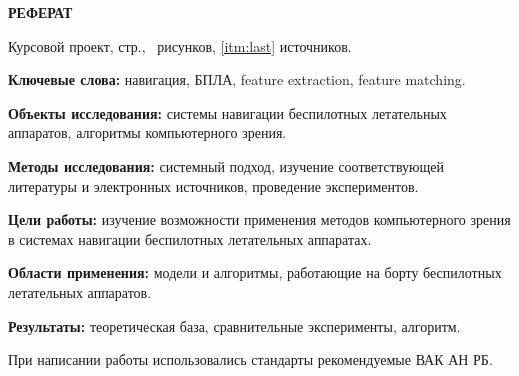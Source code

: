 \begin{center}
  \Large\bfseries{РЕФЕРАТ}
\end{center}

Курсовой проект, \pageref{LastPage} стр., \totalfigures\ рисунков, \ref{itm:last} источников.

\begin{center}
  \Large{\@jobtitle}
\end{center}

\textbf{Ключевые слова:} навигация, БПЛА, feature extraction, feature matching.

\textbf{Объекты исследования:} системы навигации беспилотных летательных аппаратов, алгоритмы компьютерного зрения.

\textbf{Методы исследования:} системный подход, изучение соответствующей литературы и электронных источников, проведение экспериментов.

\textbf{Цели работы:} изучение возможности применения методов компьютерного зрения в системах навигации беспилотных летательных аппаратах.

\textbf{Области применения:} модели и алгоритмы, работающие на борту беспилотных летательных аппаратов.

\textbf{Результаты:} теоретическая база, сравнительные эксперименты, алгоритм. 

При написании работы использовались стандарты рекомендуемые ВАК АН РБ.

\newpage